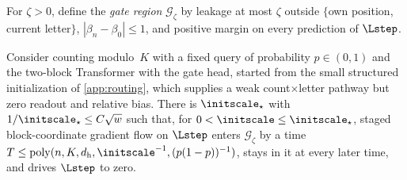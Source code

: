 For $\zeta>0$, define the \emph{gate region} $\mathcal G_\zeta$ by leakage at most $\zeta$ outside
$\{$own position, current letter$\}$, $|\beta_n-\beta_0|\le1$, and positive margin on every prediction of $\Lstep$.

\begin{theorem}
\label{thm:routing}
Consider counting modulo~$K$ with a fixed query of probability $p\in(0,1)$ and the two-block Transformer with the gate
head, started from the small structured initialization of \cref{app:routing}, which supplies a weak count$\times$letter
pathway but zero readout and relative bias. There is $\initscale_\star$ with $1/\initscale_\star\le C\sqrt w$ such that, for
$0<\initscale\le\initscale_\star$, staged block-coordinate gradient flow on $\Lstep$ enters $\mathcal G_\zeta$ by a time
$T\le\mathrm{poly}(n,K,d_{\mathrm h},\initscale^{-1},(p(1-p))^{-1})$, stays in it at every later time, and drives $\Lstep$ to
zero.
\end{theorem}
